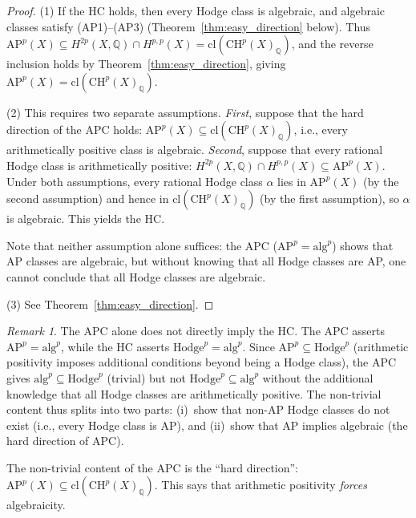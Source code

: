 \documentclass[aps,prd,twocolumn,superscriptaddress,nofootinbib]{revtex4-2}
\theoremstyle{definition}
\theoremstyle{remark}
\newtheorem{remark}[theorem]{Remark}
\begin{document}
\begin{proof}
(1) If the HC holds, then every Hodge class is algebraic, and algebraic classes satisfy (AP1)--(AP3) (Theorem~\ref{thm:easy_direction} below). Thus $\mathrm{AP}^p(X) \subseteq H^{2p}(X, \mathbb{Q}) \cap H^{p,p}(X) = \mathrm{cl}(\mathrm{CH}^p(X)_\mathbb{Q})$, and the reverse inclusion holds by Theorem~\ref{thm:easy_direction}, giving $\mathrm{AP}^p(X) = \mathrm{cl}(\mathrm{CH}^p(X)_\mathbb{Q})$.

(2) This requires two separate assumptions. \textit{First}, suppose that the hard direction of the APC holds: $\mathrm{AP}^p(X) \subseteq \mathrm{cl}(\mathrm{CH}^p(X)_\mathbb{Q})$, i.e., every arithmetically positive class is algebraic. \textit{Second}, suppose that every rational Hodge class is arithmetically positive: $H^{2p}(X, \mathbb{Q}) \cap H^{p,p}(X) \subseteq \mathrm{AP}^p(X)$. Under both assumptions, every rational Hodge class $\alpha$ lies in $\mathrm{AP}^p(X)$ (by the second assumption) and hence in $\mathrm{cl}(\mathrm{CH}^p(X)_\mathbb{Q})$ (by the first assumption), so $\alpha$ is algebraic. This yields the HC.

Note that neither assumption alone suffices: the APC ($\mathrm{AP}^p = \mathrm{alg}^p$) shows that AP classes are algebraic, but without knowing that all Hodge classes are AP, one cannot conclude that all Hodge classes are algebraic.

(3) See Theorem~\ref{thm:easy_direction}.
\end{proof}

\begin{remark}
The APC alone does not directly imply the HC. The APC asserts $\mathrm{AP}^p = \mathrm{alg}^p$, while the HC asserts $\mathrm{Hodge}^p = \mathrm{alg}^p$. Since $\mathrm{AP}^p \subseteq \mathrm{Hodge}^p$ (arithmetic positivity imposes additional conditions beyond being a Hodge class), the APC gives $\mathrm{alg}^p \subseteq \mathrm{Hodge}^p$ (trivial) but not $\mathrm{Hodge}^p \subseteq \mathrm{alg}^p$ without the additional knowledge that all Hodge classes are arithmetically positive. The non-trivial content thus splits into two parts: (i)~show that non-AP Hodge classes do not exist (i.e., every Hodge class is AP), and (ii)~show that AP implies algebraic (the hard direction of APC).
\end{remark}

The non-trivial content of the APC is the ``hard direction'': $\mathrm{AP}^p(X) \subseteq \mathrm{cl}(\mathrm{CH}^p(X)_\mathbb{Q})$. This says that arithmetic positivity \textit{forces} algebraicity.
\end{document}
